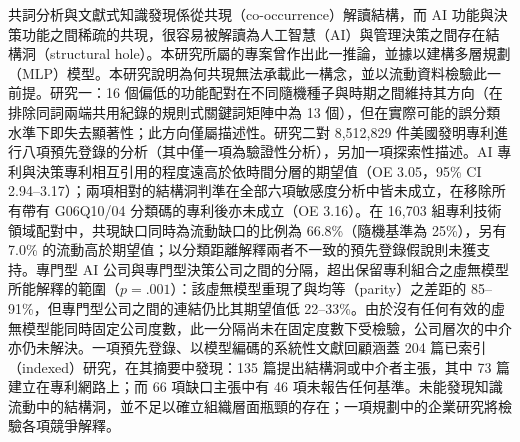 共詞分析與文獻式知識發現係從共現（co-occurrence）解讀結構，而 AI 功能與決策功能之間稀疏的共現，很容易被解讀為人工智慧（AI）與管理決策之間存在結構洞（structural hole）。本研究所屬的專案曾作出此一推論，並據以建構多層規劃（MLP）模型。本研究說明為何共現無法承載此一構念，並以流動資料檢驗此一前提。研究一：16 個偏低的功能配對在不同隨機種子與時期之間維持其方向（在排除同詞兩端共用紀錄的規則式關鍵詞矩陣中為 13 個），但在實際可能的誤分類水準下即失去顯著性；此方向僅屬描述性。研究二對 8,512,829 件美國發明專利進行八項預先登錄的分析（其中僅一項為驗證性分析），另加一項探索性描述。AI 專利與決策專利相互引用的程度遠高於依時間分層的期望值（OE 3.05，95\% CI 2.94--3.17）；兩項相對的結構洞判準在全部六項敏感度分析中皆未成立，在移除所有帶有 G06Q10/04 分類碼的專利後亦未成立（OE 3.16）。在 16,703 組專利技術領域配對中，共現缺口同時為流動缺口的比例為 66.8\%（隨機基準為 25\%），另有 7.0\% 的流動高於期望值；以分類距離解釋兩者不一致的預先登錄假說則未獲支持。專門型 AI 公司與專門型決策公司之間的分隔，超出保留專利組合之虛無模型所能解釋的範圍（$p = .001$）：該虛無模型重現了與均等（parity）之差距的 85--91\%，但專門型公司之間的連結仍比其期望值低 22--33\%。由於沒有任何有效的虛無模型能同時固定公司度數，此一分隔尚未在固定度數下受檢驗，公司層次的中介亦仍未解決。一項預先登錄、以模型編碼的系統性文獻回顧涵蓋 204 篇已索引（indexed）研究，在其摘要中發現：135 篇提出結構洞或中介者主張，其中 73 篇建立在專利網路上；而 66 項缺口主張中有 46 項未報告任何基準。未能發現知識流動中的結構洞，並不足以確立組織層面瓶頸的存在；一項規劃中的企業研究將檢驗各項競爭解釋。
